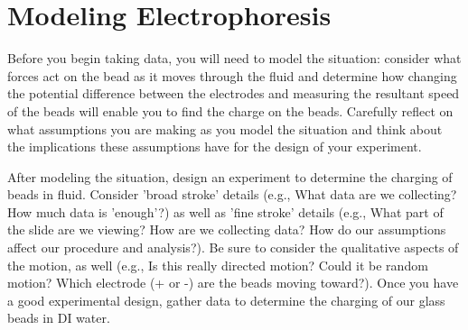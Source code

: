 \section{Modeling Electrophoresis}
Before you begin taking data, you will need to model the situation: consider what forces act on the bead as it moves through the fluid and determine how changing the potential difference between the electrodes and measuring the resultant speed of the beads will enable you to find the charge on the beads. 
Carefully reflect on what assumptions you are making as you model the situation and think about the implications these assumptions have for the design of your experiment.
\par 
After modeling the situation, design an experiment to determine the charging of beads in fluid. 
Consider 'broad stroke' details (e.g., What data are we collecting? How much data is 'enough'?) as well as 'fine stroke' details (e.g., What part of the slide are we viewing? How are we collecting data? How do our assumptions affect our procedure and analysis?). 
Be sure to consider the qualitative aspects of the motion, as well (e.g., Is this really directed motion? Could it be random motion? Which electrode (+ or -) are the beads moving toward?). 
Once you have a good experimental design, gather data to determine the charging of our glass beads in DI water.


